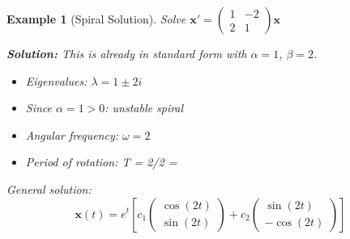 \documentclass[12pt]{article}
\newtheorem{example}{Example}
\begin{document}
\begin{example}[Spiral Solution]
Solve $\mathbf{x}' = \begin{pmatrix} 1 & -2 \\ 2 & 1 \end{pmatrix}\mathbf{x}$

\textbf{Solution:}
This is already in standard form with $\alpha = 1$, $\beta = 2$.
\begin{itemize}
\item Eigenvalues: $\lambda = 1 \pm 2i$
\item Since $\alpha = 1 > 0$: unstable spiral
\item Angular frequency: $\omega = 2$
\item Period of rotation: T = 2\pi/2 = \pi
\end{itemize}

General solution:
\[\mathbf{x}(t) = e^{t}\left[c_{1}\begin{pmatrix} \cos(2t) \\ \sin(2t) \end{pmatrix} + c_{2}\begin{pmatrix} \sin(2t) \\ -\cos(2t) \end{pmatrix}\right]\]
\end{example}
\end{document}
